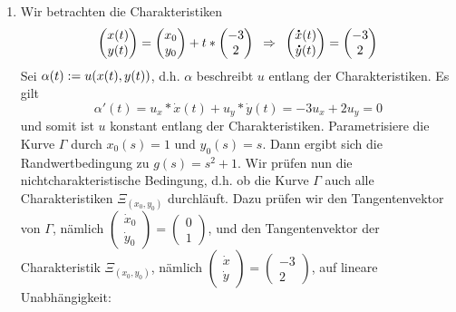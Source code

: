 \begin{exercisePage}[Charakteristikenmethode]
	\begin{enumerate}[label=(zu \alph*), leftmargin=*]
		\item Wir betrachten die Charakteristiken
		\begin{equation*}
			\begin{pmatrix} x(t) \\ y(t) \end{pmatrix} = \begin{pmatrix} x_0 \\ y_0 \end{pmatrix} + t * \begin{pmatrix} -3 \\ 2 \end{pmatrix} \enskip \Rightarrow \enskip \begin{pmatrix} \accentset{\mbox{\large\bfseries .}}{x}(t) \\ \accentset{\mbox{\large\bfseries .}}{y}(t) \end{pmatrix} = \begin{pmatrix} -3 \\ 2 \end{pmatrix}
		\end{equation*}
		Sei $\alpha(t) \mathrel{:=} u(x(t),y(t))$, d.h. $\alpha$ beschreibt $u$ entlang der Charakteristiken. Es gilt
		\begin{equation*}
			\alpha'(t) = u_x * \dot{x}(t) + u_y * \dot{y}(t) = -3u_x + 2u_y = 0
		\end{equation*}
		und somit ist $u$ konstant entlang der Charakteristiken. Parametrisiere die Kurve $\Gamma$ durch $x_0(s) = 1$ und $y_0(s) = s$. Dann ergibt sich die Randwertbedingung zu $g(s) = s^2 + 1$. Wir prüfen nun die nichtcharakteristische Bedingung, d.h. ob die Kurve $\Gamma$ auch alle Charakteristiken $\Xi_{(x_0,y_0)}$ durchläuft. Dazu prüfen wir den Tangentenvektor von $\Gamma$, nämlich $\left(\begin{smallmatrix} \dot{x}_0 \\ \dot{y}_0 \end{smallmatrix}\right) = \left(\begin{smallmatrix} 0 \\ 1 \end{smallmatrix}\right)$, und den Tangentenvektor der Charakteristik $\Xi_{(x_0,y_0)}$, nämlich $\left(\begin{smallmatrix} \dot{x} \\ \dot{y} \end{smallmatrix}\right) = \left(\begin{smallmatrix} -3 \\ 2 \end{smallmatrix}\right)$, auf lineare Unabhängigkeit:

\end{enumerate}
\end{exercisePage}
